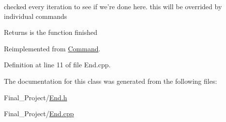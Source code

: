 checked every iteration to see if we're done here. this will be overrided by individual commands 

\begin{DoxyReturn}{Returns}
is the function finished 
\end{DoxyReturn}


Reimplemented from \hyperlink{classCommand_ae5846b4332a262e055c7a96759fa18f2}{Command}.



Definition at line 11 of file End.\-cpp.



The documentation for this class was generated from the following files\-:\begin{DoxyCompactItemize}
\item 
Final\-\_\-\-Project/\hyperlink{End_8h}{End.\-h}\item 
Final\-\_\-\-Project/\hyperlink{End_8cpp}{End.\-cpp}\end{DoxyCompactItemize}

